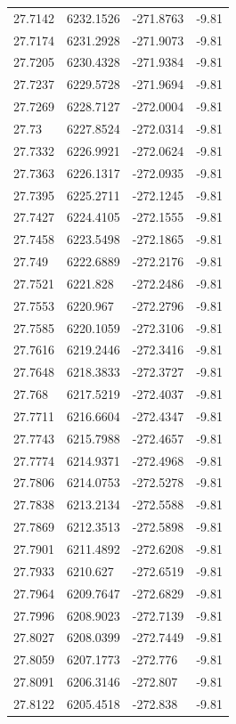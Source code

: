 \begin{table}[H]
\begin{tabular}{llll}
27.7142 & 6232.1526 & -271.8763 & -9.81 \\
27.7174 & 6231.2928 & -271.9073 & -9.81 \\
27.7205 & 6230.4328 & -271.9384 & -9.81 \\
27.7237 & 6229.5728 & -271.9694 & -9.81 \\
27.7269 & 6228.7127 & -272.0004 & -9.81 \\
27.73 & 6227.8524 & -272.0314 & -9.81 \\
27.7332 & 6226.9921 & -272.0624 & -9.81 \\
27.7363 & 6226.1317 & -272.0935 & -9.81 \\
27.7395 & 6225.2711 & -272.1245 & -9.81 \\
27.7427 & 6224.4105 & -272.1555 & -9.81 \\
27.7458 & 6223.5498 & -272.1865 & -9.81 \\
27.749 & 6222.6889 & -272.2176 & -9.81 \\
27.7521 & 6221.828 & -272.2486 & -9.81 \\
27.7553 & 6220.967 & -272.2796 & -9.81 \\
27.7585 & 6220.1059 & -272.3106 & -9.81 \\
27.7616 & 6219.2446 & -272.3416 & -9.81 \\
27.7648 & 6218.3833 & -272.3727 & -9.81 \\
27.768 & 6217.5219 & -272.4037 & -9.81 \\
27.7711 & 6216.6604 & -272.4347 & -9.81 \\
27.7743 & 6215.7988 & -272.4657 & -9.81 \\
27.7774 & 6214.9371 & -272.4968 & -9.81 \\
27.7806 & 6214.0753 & -272.5278 & -9.81 \\
27.7838 & 6213.2134 & -272.5588 & -9.81 \\
27.7869 & 6212.3513 & -272.5898 & -9.81 \\
27.7901 & 6211.4892 & -272.6208 & -9.81 \\
27.7933 & 6210.627 & -272.6519 & -9.81 \\
27.7964 & 6209.7647 & -272.6829 & -9.81 \\
27.7996 & 6208.9023 & -272.7139 & -9.81 \\
27.8027 & 6208.0399 & -272.7449 & -9.81 \\
27.8059 & 6207.1773 & -272.776 & -9.81 \\
27.8091 & 6206.3146 & -272.807 & -9.81 \\
27.8122 & 6205.4518 & -272.838 & -9.81 \\

\end{tabular}
\end{table}

